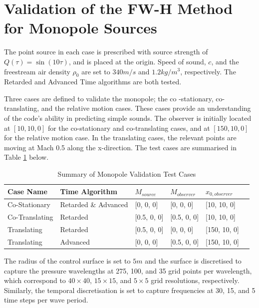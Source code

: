 
\section{Validation of the FW-H Method for Monopole Sources} \label{sec:monopole_validation}
The point source in each case is prescribed with source strength of $Q(\tau)=\sin(10\tau)$, and is placed at the origin. Speed of sound, $c$, and the freestream air density $\rho_0$ are set to $340m/s$ and $1.2kg/m^3$, respectively. The Retarded and Advanced Time algorithms are both tested. 

Three cases are defined to validate the monopole; the co -stationary, co-translating, and the relative motion cases. These cases provide an understanding of the code's ability in predicting simple sounds. The observer is initially located at $[10,10,0]$ for the co-stationary and co-translating cases, and at $[150,10,0]$ for the relative motion case. In the translating cases, the relevant points are moving at Mach 0.5 along the x-direction. The test cases are summarised in Table \ref{tab:monopole_validation_test_case} below.

\begin{table}[H]
    \centering
    \caption{Summary of Monopole Validation Test Cases}
    \label{tab:monopole_validation_test_case}
    \begin{tabular}{p{2.8cm} p{5cm} p{2cm} p{2cm} p{2.5cm} l}
        \toprule
        \textbf{Case Name} & \textbf{Time Algorithm} &\textbf{$M_{source}$} & \textbf{$M_{observer}$} & \textbf{$x_{0,observer}$} \\
        \midrule
        Co-Stationary & Retarded \& Advanced & [0, 0, 0] & [0, 0, 0] & [10, 10, 0] \\
        Co-Translating & Retarded & [0.5, 0, 0] & [0.5, 0, 0] & [10, 10, 0] \\
        Translating & Retarded & [0.5, 0, 0] & [0, 0, 0] & [150, 10, 0] \\
        Translating & Advanced & [0, 0, 0] & [0.5, 0, 0] & [150, 10, 0] \\
        \bottomrule
    \end{tabular}
\end{table}

The radius of the control surface is set to $5m$ and the surface is discretised to capture the pressure wavelengths at 275, 100, and 35 grid points per wavelength, which correspond to $40 \times 40$, $15 \times 15$, and $5\times5$ grid resolutions, respectively. Similarly, the temporal discretisation is set to capture frequencies at 30, 15, and 5 time steps per wave period. 

